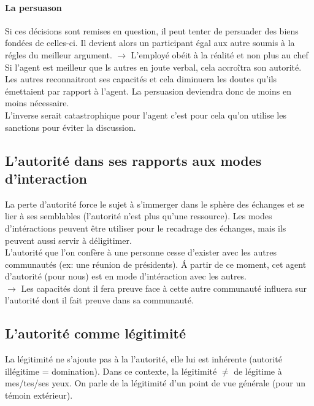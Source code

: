 \documentclass[11pt]{article} %
\begin{document}
	\paragraph{La persuason} Si ces décisions sont remises en question, il peut tenter de persuader des 
	biens fondées de celles-ci. Il devient alors un participant égal aux autre soumis à la régles du meilleur
	argument. $\to$ L'employé obéit à la réalité et non plus au chef\\
	Si l'agent est meilleur que ls autres en joute verbal, cela accroîtra son autorité. Les autres reconnaitront
	ses capacités et cela diminuera les doutes qu'ils émettaient par rapport à l'agent. La persuasion 
	deviendra donc de moins en moins nécessaire.\\
	 L'inverse serait catastrophique pour l'agent c'est pour cela qu'on utilise les sanctions pour éviter la
	 discussion.
	\subsection{L'autorité dans ses rapports aux modes d'interaction}
		La perte d'autorité force le sujet à s'immerger dans le sphère des échanges et se lier à ses semblables
		(l'autorité n'est plus qu'une ressource). Les modes d'intéractions peuvent être utiliser pour le
		recadrage des échanges, mais ils peuvent aussi servir à déligitimer.\\
		L'autorité que l'on confère à une personne cesse d'exister avec les autres communautés  (ex: une
		réunion de présidents). Á partir de ce moment, cet agent d'autorité (pour nous) est en mode 
		d'intéraction avec les autres.\\
		$\to$ Les capacités dont il fera preuve face à cette autre communauté influera sur l'autorité dont il 
		fait preuve dans sa communauté.
	\subsection{L'autorité comme légitimité}
		La légitimité ne s'ajoute pas à la l'autorité, elle lui est inhérente (autorité illégitime = domination).
		Dans ce contexte, la légitimité $\neq$ de légitime à mes/tes/ses yeux. On parle de la légitimité d'un 
		point de vue générale (pour un témoin extérieur).
\end{document}

